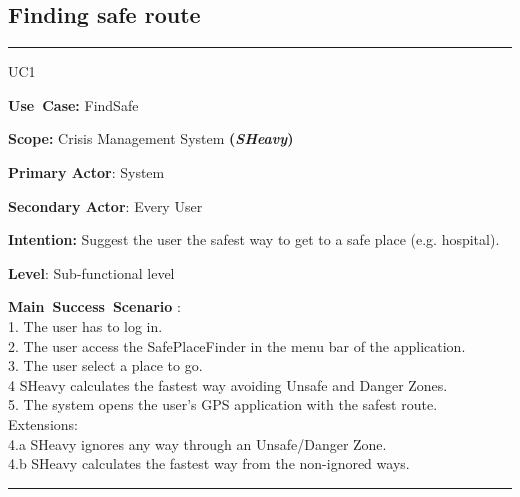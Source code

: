 \subsection{Finding safe route}
\vspace{0.5cm}
\hrule
\vspace{0.5cm}
\begin{lyxlist}{UC1}
\small{
\item [\textbf{Use~Case:}] FindSafe
\item [\textbf{Scope:}] Crisis Management System \textbf{(\emph{SHeavy})}
\item [\textbf{Primary Actor}:] System
\item [\textbf{Secondary Actor}:] Every User
\item [\textbf{Intention:}]Suggest the user the safest way to get to a safe
place (e.g. hospital).
\item [\textbf{Level}:]Sub-functional level
\item [\textbf{Main~Success~Scenario}]:\\
1. The user has to log in.\\
2. The user access the SafePlaceFinder in the menu bar of the application.\\
3. The user select a place to go.\\
4  SHeavy calculates the fastest way avoiding Unsafe and Danger Zones.\\
5. The system opens the user's GPS application with the safest route.\\
Extensions:\\
	4.a SHeavy ignores any way through an Unsafe/Danger Zone.\\
	4.b SHeavy calculates the fastest way from the non-ignored ways.\\ 
\item 
}
\end{lyxlist}
\hrule
\vspace{0.5cm}

